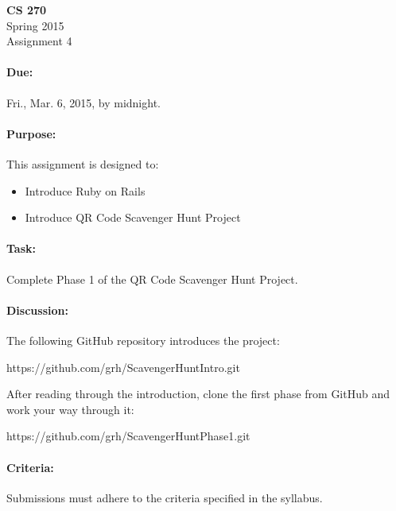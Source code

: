 \documentclass[11pt]{article}
\begin{document}
    \begin{center}

        \large\textbf{CS 270} \\
        Spring 2015 \\
        Assignment 4 \\

    \end{center}

    \paragraph{Due:} Fri., Mar. 6, 2015, by midnight.

    \paragraph{Purpose:} This assignment is designed to:

        \begin{itemize}

            \item Introduce Ruby on Rails

            \item Introduce QR Code Scavenger Hunt Project

        \end{itemize}

    \paragraph{Task:} Complete Phase 1 of the QR Code Scavenger Hunt
    Project.
    
    \paragraph{Discussion:} The following GitHub repository introduces the
    project:

    \begin{center}

        https://github.com/grh/ScavengerHuntIntro.git

    \end{center}

    After reading through the introduction, clone the first phase from
    GitHub and work your way through it:

    \begin{center}

        https://github.com/grh/ScavengerHuntPhase1.git

    \end{center}

    \paragraph{Criteria:} Submissions must adhere to the criteria
    specified in the syllabus.
\end{document}
